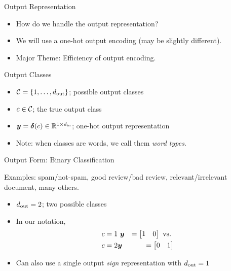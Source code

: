 \documentclass{beamer}
\begin{document}
\begin{frame}{Output Representation}
  \begin{itemize}
  \item How do we handle the output representation?
  \item We will use a one-hot output encoding (may be slightly different).
  \item Major Theme: Efficiency of output encoding.
  \end{itemize}
\end{frame}




\begin{frame}{Output Classes}
  \begin{itemize}
  \item $\mathcal{C} = \{1, \ldots, {d_{\mathrm{out}}}\}$; possible output classes
  \item $c \in \mathcal{C}$; the true output class 
  \item $\boldsymbol{y} = \boldsymbol{\delta}(c) \in \mathbb{R}^{1\times {d_{\mathrm{in}}}}$; one-hot output representation

  \item Note: when classes are words, we call them \textit{word types}. 
  \end{itemize}
\end{frame}

\begin{frame}{Output Form: Binary Classification}

  Examples: spam/not-spam, good review/bad review, relevant/irrelevant document, many others.   
  \begin{itemize}
  \item ${d_{\mathrm{out}}} = 2$; two possible classes
  \item In our notation,
    \begin{eqnarray*} 
    c = 1 & \  \boldsymbol{y} &= \begin{bmatrix} 1 & 0  \end{bmatrix}  \mathrm {\ vs. \ } \\
    c = 2 & \boldsymbol{y} &= \begin{bmatrix} 0  & 1  \end{bmatrix} 
   \end{eqnarray*} 
   \item Can also use a single output \textit{sign} representation with ${d_{\mathrm{out}}} = 1$ 
  \end{itemize}

\end{frame}


\end{document}
